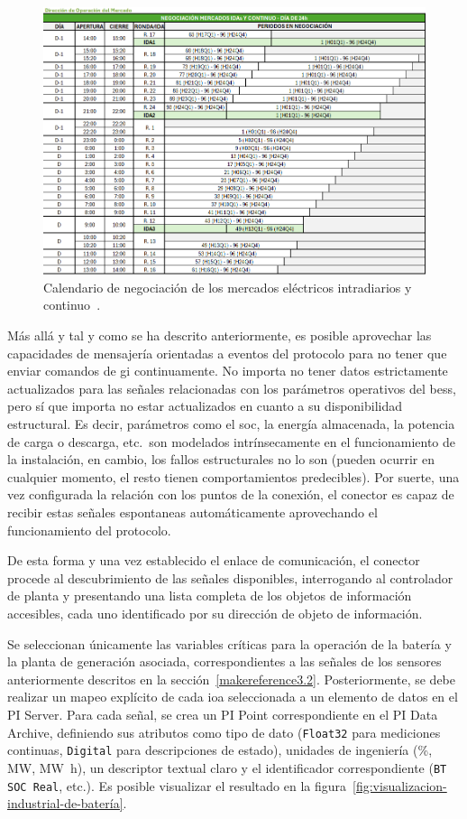 \begin{figure}
  \centering
  \includegraphics[width=0.75\linewidth]{figures/tiempo-mercados.png}
  \caption[Calendario de negociación de los mercados eléctricos.]{Calendario de negociación de los mercados eléctricos intradiarios y continuo~\cite{omie2025mercado}.}
  \label{fig:tiempo-mercados}
\end{figure}

Más allá y tal y como se ha descrito anteriormente, es posible aprovechar las capacidades de mensajería orientadas a eventos del protocolo para no tener que enviar comandos de \gls{gi} continuamente. No importa no tener datos estrictamente actualizados para las señales relacionadas con los parámetros operativos del \gls{bess}, pero sí que importa no estar actualizados en cuanto a su disponibilidad estructural. Es decir, parámetros como el \gls{soc}, la energía almacenada, la potencia de carga o descarga, etc.\ son modelados intrínsecamente en el funcionamiento de la instalación, en cambio, los fallos estructurales no lo son (pueden ocurrir en cualquier momento, el resto tienen comportamientos predecibles). Por suerte, una vez configurada la relación con los puntos de la conexión, el conector es capaz de recibir estas señales espontaneas automáticamente aprovechando el funcionamiento del protocolo.

De esta forma y una vez establecido el enlace de comunicación, el conector procede al descubrimiento de las señales disponibles, interrogando al controlador de planta y presentando una lista completa de los objetos de información accesibles, cada uno identificado por su dirección de objeto de información.

Se seleccionan únicamente las variables críticas para la operación de la batería y la planta de generación asociada, correspondientes a las señales de los sensores anteriormente descritos en la sección~\ref{makereference3.2}. Posteriormente, se debe realizar un mapeo explícito de cada \gls{ioa} seleccionada a un elemento de datos en el PI Server. Para cada señal, se crea un PI Point correspondiente en el PI Data Archive, definiendo sus atributos como tipo de dato (\texttt{Float32} para mediciones continuas, \texttt{Digital} para descripciones de estado), unidades de ingeniería (\si{\percent}, \si{\mega\watt}, \si{\mega\watt\hour}), un descriptor textual claro y el identificador correspondiente (\texttt{BT SOC Real}, etc.). Es posible visualizar el resultado en la figura~\ref{fig:visualizacion-industrial-de-batería}.

